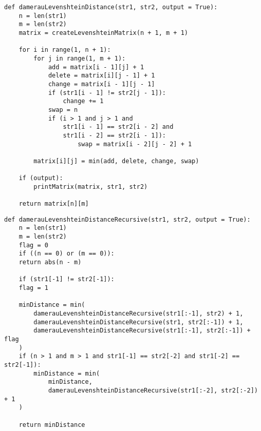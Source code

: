 \begin{center}
    \captionsetup{justification=raggedright,singlelinecheck=off}
    \begin{lstlisting}[label=lst:dam_lev_mat,caption=Алгоритм нахождения расстояния Дамерау-Левенштейна (матричный)]
def damerauLevenshteinDistance(str1, str2, output = True):
	n = len(str1)
	m = len(str2)
	matrix = createLevenshteinMatrix(n + 1, m + 1)
	
	for i in range(1, n + 1):
		for j in range(1, m + 1):
			add = matrix[i - 1][j] + 1
			delete = matrix[i][j - 1] + 1
			change = matrix[i - 1][j - 1]
			if (str1[i - 1] != str2[j - 1]):
				change += 1
			swap = n
			if (i > 1 and j > 1 and
				str1[i - 1] == str2[i - 2] and
				str1[i - 2] == str2[i - 1]):
					swap = matrix[i - 2][j - 2] + 1
		
		matrix[i][j] = min(add, delete, change, swap)
	
	if (output):
		printMatrix(matrix, str1, str2)
	
	return matrix[n][m]
\end{lstlisting}
\end{center}


\begin{center}
    \captionsetup{justification=raggedright,singlelinecheck=off}
    \begin{lstlisting}[label=lst:dam_lev_rec,caption=Алгоритм нахождения расстояния Дамерау-Левенштейна (рекурсивный)]
def damerauLevenshteinDistanceRecursive(str1, str2, output = True):
	n = len(str1)
	m = len(str2)
	flag = 0
	if ((n == 0) or (m == 0)):
	return abs(n - m)
	
	if (str1[-1] != str2[-1]):
	flag = 1
	
	minDistance = min(
		damerauLevenshteinDistanceRecursive(str1[:-1], str2) + 1,
		damerauLevenshteinDistanceRecursive(str1, str2[:-1]) + 1,
		damerauLevenshteinDistanceRecursive(str1[:-1], str2[:-1]) + flag
	)
	if (n > 1 and m > 1 and str1[-1] == str2[-2] and str1[-2] == str2[-1]):
		minDistance = min(
			minDistance,
			damerauLevenshteinDistanceRecursive(str1[:-2], str2[:-2]) + 1
	)
	
	return minDistance
\end{lstlisting}
\end{center}


